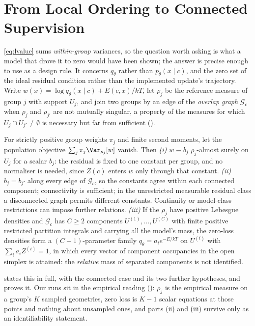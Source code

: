 \section{From Local Ordering to Connected Supervision}
\label{sec:theory}

\eqref{eq:lvalue} sums \emph{within-group} variances, so the question worth asking is what a model
that drove it to zero would have been shown; the answer is precise enough to use as a design rule.
It concerns $q_\theta$ rather than $p_\theta(x \mid c)$, and the zero set of the ideal residual
condition rather than the implemented update's trajectory. Write
$w(x) = \log q_\theta(x \mid c) + E(c,x)/kT$, let $\rho_j$ be the reference measure of group $j$ with
support $U_j$, and join two groups by an edge of the \emph{overlap graph} $\mathcal{G}_c$ when
$\rho_j$ and $\rho_{j'}$ are not mutually singular, a property of the measures for which
$U_j \cap U_{j'} \neq \emptyset$ is necessary but far from sufficient ().

\begin{proposition}
\label{prop:ident}
For strictly positive group weights $\pi_j$ and finite second moments, let the population objective $\sum_j \pi_j \Var_{\rho_j}[w]$ vanish. Then \emph{(i)} $w \equiv b_j$
$\rho_j$-almost surely on $U_j$ for a scalar $b_j$: the residual is fixed to one constant per group,
and no normaliser is needed, since $Z(c)$ enters $w$ only through that constant.
\emph{(ii)} $b_j = b_{j'}$ along every edge of $\mathcal{G}_c$, so the constants agree within each
connected component; connectivity is sufficient; in the unrestricted measurable residual class a disconnected graph permits different constants. Continuity or model-class restrictions can impose further relations. \emph{(iii)} If the $\rho_j$
have positive Lebesgue densities and $\mathcal{G}_c$ has $C \ge 2$ components $U^{(1)},\dots,U^{(C)}$
with finite positive restricted partition integrals and carrying all the model's mass, the zero-loss densities form a $(C-1)$-parameter family
$q_\theta = a_i e^{-E/kT}$ on $U^{(i)}$ with $\sum_i a_i Z^{(i)} = 1$, in which every vector of
component occupancies in the open simplex is attained: the \emph{relative} mass of separated
components is not identified.
\end{proposition}

 states this in full, with the connected case and its two further hypotheses, and
 proves it. Our runs sit in the empirical reading (): $\rho_j$ is
the empirical measure on a group's $K$ sampled geometries, zero loss is $K-1$ scalar equations at
those points and nothing about unsampled ones, and parts (ii) and (iii) survive only as an
identifiability statement.

